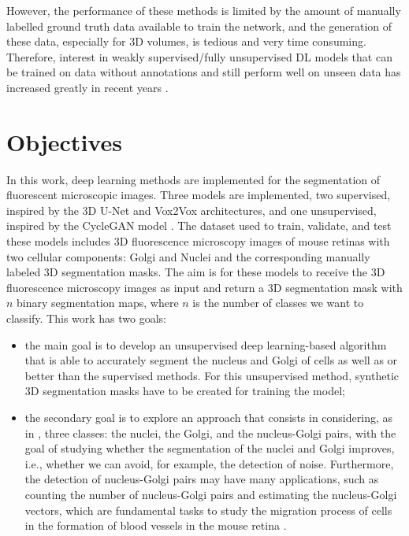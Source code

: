 However, the performance of these methods is limited by the amount of manually labelled ground truth data available to train the network, and the generation of these data, especially for \ac{3D} volumes, is tedious and very time consuming. Therefore, interest in weakly supervised/fully unsupervised \ac{DL} models that can be trained on data without annotations and still perform well on unseen data has increased greatly in recent years \cite{review:3}.



\section{Objectives}
\label{section:objectives}

In this work, deep learning methods are implemented for the segmentation of fluorescent microscopic images. Three models are implemented, two supervised, inspired by the \ac{3D} U-Net \cite{Unet:3D} and Vox2Vox \cite{isola2018imagetoimage} architectures, and one unsupervised, inspired by the CycleGAN model \cite{cycleGAN:original}. The dataset used to train, validate, and test these models includes \ac{3D} fluorescence microscopy images of mouse retinas with two cellular components: Golgi and Nuclei and the corresponding manually labeled \ac{3D} segmentation masks. The aim is for these models to receive the \ac{3D} fluorescence microscopy images as input and return a \ac{3D} segmentation mask with $n$ binary segmentation maps, where $n$ is the number of classes we want to classify. This work has two goals:

\begin{itemize} 

\item the main goal is to develop an unsupervised deep learning-based algorithm that is able to accurately segment the nucleus and Golgi of cells as well as or better than the supervised methods. For this unsupervised method, synthetic \ac{3D} segmentation masks have to be created for training the model; 

\item the secondary goal is to explore an approach that consists in considering, as in \cite{nuclei&golgi}, three classes: the nuclei, the Golgi, and the nucleus-Golgi pairs, with the goal of studying whether the segmentation of the nuclei and Golgi improves, i.e., whether we can avoid, for example, the detection of noise. Furthermore, the detection of nucleus-Golgi pairs may have many applications, such as counting the number of nucleus-Golgi pairs and estimating the nucleus-Golgi vectors, which are fundamental tasks to study the migration process of cells in the formation of blood vessels in the mouse retina \cite{nuclei&golgi}.
\end{itemize}

